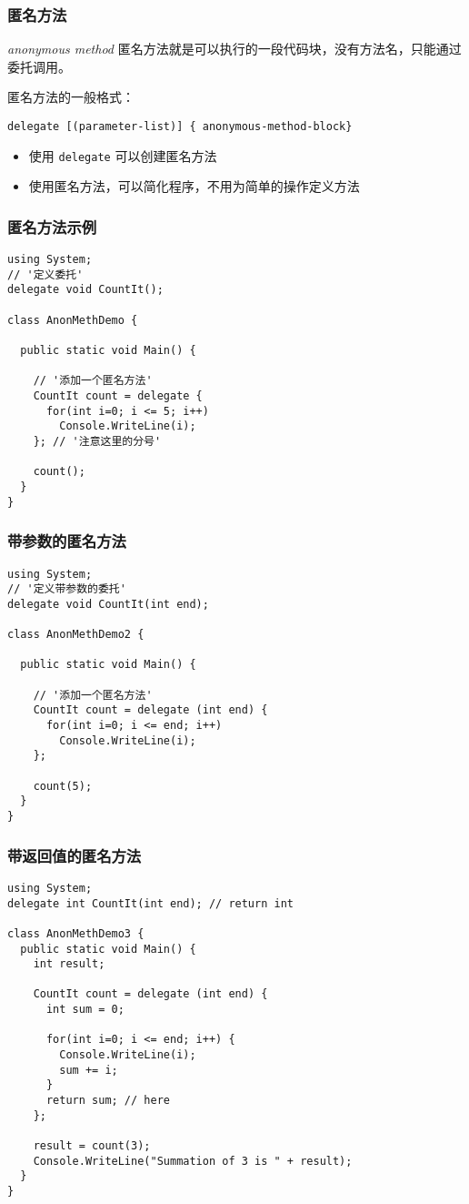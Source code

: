 \begin{frame}[fragile]
\frametitle{匿名方法}
\begin{block}{\textit{anonymous method}}
  \CJKindent 匿名方法就是可以执行的一段代码块，没有方法名，只能通过委托调用。
\end{block}
匿名方法的一般格式：
\begin{lstlisting}
delegate [(parameter-list)] { anonymous-method-block}
\end{lstlisting}
\begin{itemize}
\item 使用 \texttt{delegate} 可以创建匿名方法
\item 使用匿名方法，可以简化程序，不用为简单的操作定义方法
\end{itemize}
\end{frame}
\begin{frame}[fragile]
\frametitle{匿名方法示例}
\begin{lstlisting}[escapeinside='']
using System;
// '定义委托'
delegate void CountIt();

class AnonMethDemo {

  public static void Main() {

    // '添加一个匿名方法'
    CountIt count = delegate {
      for(int i=0; i <= 5; i++)
        Console.WriteLine(i);
    }; // '注意这里的分号'

    count();
  }
}
\end{lstlisting}

\end{frame}

\begin{frame}[fragile]
\frametitle{带参数的匿名方法}
\begin{lstlisting}[escapeinside='']
using System;
// '定义带参数的委托'
delegate void CountIt(int end);

class AnonMethDemo2 {

  public static void Main() {

    // '添加一个匿名方法'
    CountIt count = delegate (int end) {
      for(int i=0; i <= end; i++)
        Console.WriteLine(i);
    };

    count(5);
  }
}
\end{lstlisting}

\end{frame}

\begin{frame}
\frametitle{带返回值的匿名方法}
\begin{lstlisting}
using System;
delegate int CountIt(int end); // return int

class AnonMethDemo3 {
  public static void Main() {
    int result;

    CountIt count = delegate (int end) {
      int sum = 0;

      for(int i=0; i <= end; i++) {
        Console.WriteLine(i);
        sum += i;
      }
      return sum; // here
    };

    result = count(3);
    Console.WriteLine("Summation of 3 is " + result);
  }
}
\end{lstlisting}
\end{frame}

